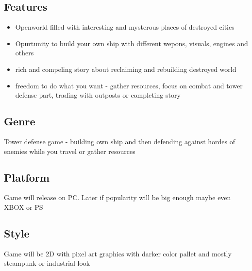 \documentclass[a4paper,10pt,english]{article}
\begin{document}
\subsection*{Features}

\begin{itemize}
    \item Openworld filled with interesting and mysterous places of destroyed cities
    \item Opurtunity to build your own ship with different wepons, visuals, engines and others
    \item rich and compeling story about reclaiming and rebuilding destroyed world
    \item freedom to do what you want - gather resources, focus on combat and tower defense part, trading with outposts or completing story
\end{itemize}

\subsection*{Genre}
Tower defense game - building own ship and then defending against hordes of enemies while you travel or gather resources

\subsection*{Platform}
Game will release on PC. Later if popularity will be big enough maybe even XBOX or PS

\subsection*{Style}
Game will be 2D with pixel art graphics with darker color pallet and mostly steampunk or industrial look
\end{document}
